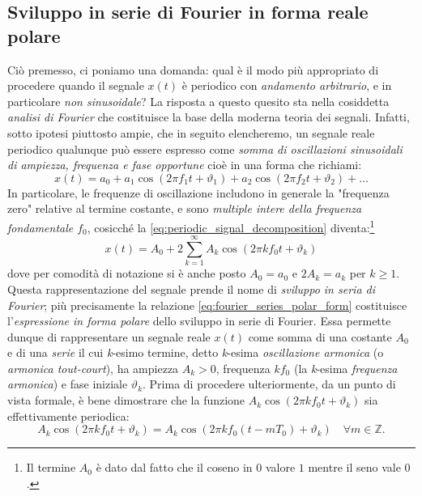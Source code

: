 \documentclass[12pt,oneside,openany]{memoir}
\numberwithin{equation}{subsection}
\begin{document}
\subsection{Sviluppo in serie di Fourier in forma reale polare}
Ci\`o premesso, ci poniamo una domanda: qual \`e il modo pi\`u appropriato di procedere quando il segnale $x(t)$ \`e periodico con \textit{andamento arbitrario}, e in particolare \textit{non sinusoidale}? La risposta a questo quesito sta nella cosiddetta \textit{analisi di Fourier} che costituisce la base della moderna teoria dei segnali. Infatti, sotto ipotesi piuttosto ampie, che in seguito elencheremo, un segnale reale periodico qualunque pu\`o essere espresso come \textit{somma di oscillazioni sinusoidali di ampiezza, frequenza e fase opportune} cio\`e in una forma che richiami:
\begin{equation}\label{eq:periodic_signal_decomposition}
	x(t) = a_0 + a_1 \cos(2 \pi f_1 t + \vartheta_1) + a_2 \cos(2 \pi f_2 t + \vartheta_2) + \dots
\end{equation}
In particolare, le frequenze di oscillazione includono in generale la "frequenza zero" relative al termine costante, e sono \textit{multiple intere della frequenza fondamentale $f_0$}, cosicch\'e la \eqref{eq:periodic_signal_decomposition} diventa:\footnote{Il termine $A_0$ \`e dato dal fatto che il coseno in $0$ valore $1$ mentre il seno vale $0$.}
\begin{equation}\label{eq:fourier_series_polar_form}
	x(t) = A_0 + 2 \sum_{k = 1}^{\infty} A_k \cos(2 \pi k f_0 t + \vartheta_k)
\end{equation}
dove per comodit\`a di notazione si \`e anche posto $A_0 = a_0$ e $2A_k = a_k$ per $k \geq 1$. Questa rappresentazione del segnale prende il nome di \textit{sviluppo in seria di Fourier}; pi\`u precisamente la relazione \eqref{eq:fourier_series_polar_form} costituisce l'\textit{espressione in forma polare} dello sviluppo in serie di Fourier. Essa permette dunque di rappresentare un segnale reale $x(t)$ come somma di una costante $A_0$ e di una \textit{serie} il cui \textit{k}-esimo termine, detto \textit{k}-esima \textit{oscillazione armonica} (o \textit{armonica tout-court}), ha ampiezza $A_k > 0$, frequenza $kf_0$ (la \textit{k}-esima \textit{frequenza armonica}) e fase iniziale $\vartheta_k$.
\bigbreak
Prima di procedere ulteriormente, da un punto di vista formale, \`e bene dimostrare che la funzione $A_k \cos(2 \pi k f_0 t + \vartheta_k)$ sia effettivamente periodica:
\[
	A_k \cos(2 \pi k f_0 t + \vartheta_k) = A_k \cos(2 \pi k f_0 (t - mT_0) + \vartheta_k) \quad \forall m \in \mathbb{Z}.
\]
\end{document}
